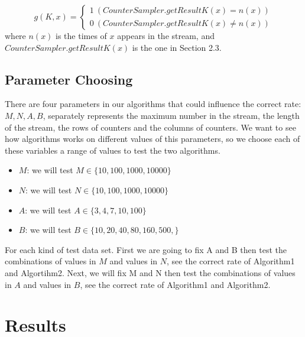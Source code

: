 \documentclass{article}
\begin{document}
\begin{equation}
    g(K,x)=\left\{
                \begin{array}{ll}
                  1\ (CounterSampler.getResultK(x) = n(x))\\
                  0\ (CounterSampler.getResultK(x) \neq n(x)) 
                \end{array}
              \right.
\end{equation}
where $n(x)$ is the times of $x$ appears in the stream, and $CounterSampler.getResultK(x)$ is the one in Section 2.3.

\subsection{Parameter Choosing}
There are four parameters in our algorithms that could influence the correct rate: $M, N, A, B$, separately represents the maximum number in the stream, the length of the stream, the rows of counters and the columns of counters. We want to see how algorithms works on different values of this parameters, so we choose each of these variables a range of values to test the two algorithms.

\begin{itemize}
\item $M$: we will test $M \in \{10, 100, 1000, 10000\}$
\item $N$: we will test $N \in \{10, 100, 1000, 10000\}$
\item $A$: we will test $A \in \{3, 4, 7, 10, 100\}$
\item $B$: we will test $B \in \{10, 20, 40, 80, 160, 500, \}$
\end{itemize} 

For each kind of test data set. First we are going to fix A and B then test the combinations of values in $M$ and values in $N$, see the correct rate of Algorithm1 and Algortihm2. Next, we will fix M and N then test the combinations of values in $A$ and values in $B$, see the correct rate of Algorithm1 and Algorithm2.


\section{Results}
\end{document}
